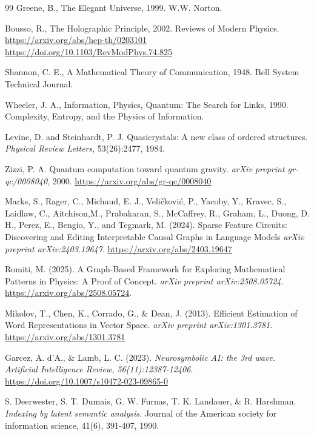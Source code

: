 \documentclass[11pt, a4paper]{article}
\begin{document}
\begin{thebibliography}{99}
			Greene, B., The Elegant Universe, 1999. W.W. Norton.
			
			Bousso, R., The Holographic Principle, 2002. Reviews of Modern Physics. \url{https://arxiv.org/abs/hep-th/0203101} \url{https://doi.org/10.1103/RevModPhys.74.825}
			
			\gdef\allclaims#1{}%
			Shannon, C. E., A Mathematical Theory of Communication, 1948. Bell System Technical Journal.
			
			Wheeler, J. A., Information, Physics, Quantum: The Search for Links, 1990. Complexity, Entropy, and the Physics of Information.
			
			Levine, D. and Steinhardt, P. J. Quasicrystals: A new class of ordered structures. \textit{Physical Review Letters}, 53(26):2477, 1984.
			
			Zizzi, P. A. Quantum computation toward quantum gravity. \textit{arXiv preprint gr-qc/0008040}, 2000. \url{https://arxiv.org/abs/gr-qc/0008040}
			
		
			
			Marks, S., Rager, C., Michaud, E. J., Veličković, P., Yacoby, Y., Kravec, S., Laidlaw, C., Aitchison,M., Prabakaran, S., McCaffrey, R., Graham, L., Duong, D. H., Perez, E., Bengio, Y., and Tegmark, M. (2024).
			Sparse Feature Circuits: Discovering and Editing Interpretable Causal Graphs in Language Models
			\textit{arXiv preprint arXiv:2403.19647}. \url{https://arxiv.org/abs/2403.19647}
			
			Romiti, M. (2025).
			A Graph-Based Framework for Exploring Mathematical Patterns in Physics: A Proof of Concept.
			\textit{arXiv preprint arXiv:2508.05724}.
			\url{https://arxiv.org/abs/2508.05724}.
			
			Mikolov, T., Chen, K., Corrado, G., \& Dean, J. (2013).
			Efficient Estimation of Word Representations in Vector Space.
			\textit{arXiv preprint arXiv:1301.3781}. \url{https://arxiv.org/abs/1301.3781}
			
			Garcez, A. d'A., \& Lamb, L. C. (2023).
			\textit{Neurosymbolic AI: the 3rd wave.}
			\textit{Artificial Intelligence Review, 56(11):12387-12406}. \url{https://doi.org/10.1007/s10472-023-09865-0}
			
			
			
			S. Deerwester, S. T. Dumais, G. W. Furnas, T. K. Landauer, \& R. Harshman.
			\textit{Indexing by latent semantic analysis.}
			Journal of the American society for information science, 41(6), 391-407, 1990.
			

\end{thebibliography}
\end{document}
